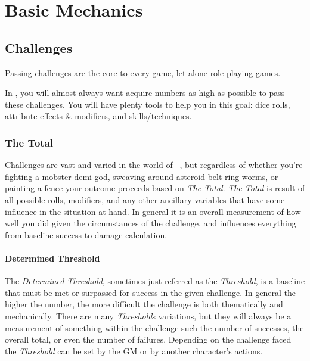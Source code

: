 \part{Basic Mechanics}\label{part:basics}
\chapter{Challenges}\label{ch:challenges}
Passing challenges are the core to every game, let alone role playing games. 

In \gametitlemini, you will almost always want acquire numbers as
high as possible to pass these challenges. You will have plenty tools
to help you in this goal: dice rolls, attribute effects \& modifiers,
and skills/techniques. 

\section{The Total}\label{sec:thetotal}
Challenges are vast and varied in the world of \gametitlemini\ , but regardless of whether you're fighting a mobster demi-god, sweaving around asteroid-belt ring worms, or painting a fence your outcome proceeds based on \emph{The Total}. \emph{The Total} is result of all possible rolls, modifiers, and any other ancillary variables that have some influence in the situation at hand. In general it is an overall measurement of how well you did given the circumstances of the challenge, and influences everything from baseline success to damage calculation.

\subsection{Determined Threshold}\label{subsec:determined_threshold}
The \emph{Determined Threshold}, sometimes just referred as the \emph{Threshold}, is a baseline that must be met or surpassed for success in the given challenge. In general the higher the number, the more difficult the challenge is both thematically and mechanically. There are many \emph{Threshold}s variations, but they will always be a measurement of something within the challenge such the number of successes, the overall total, or even the number of failures. Depending on the challenge faced the \emph{Threshold} can be set by the GM or by another character's actions.



